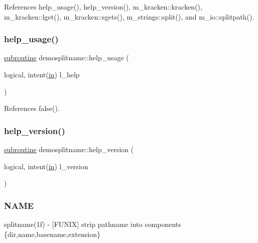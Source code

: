 References help\+\_\+usage(), help\+\_\+version(), m\+\_\+kracken\+::kracken(), m\+\_\+kracken\+::lget(), m\+\_\+kracken\+::sgets(), m\+\_\+strings\+::split(), and m\+\_\+io\+::splitpath().

\mbox{\label{splitname_8f90_ae98d08b210b063a2558aa2abdb67fa8e}} 
\subsubsection{\texorpdfstring{help\+\_\+usage()}{help\_usage()}}
{\footnotesize\ttfamily \hyperlink{M__stopwatch_83_8txt_acfbcff50169d691ff02d4a123ed70482}{subroutine} demosplitname\+::help\+\_\+usage (\begin{DoxyParamCaption}\item[{logical, intent(\hyperlink{M__journal_83_8txt_afce72651d1eed785a2132bee863b2f38}{in})}]{l\+\_\+help }\end{DoxyParamCaption})}



References false().

\mbox{\label{splitname_8f90_a2518cc098132c46ba9d8fd8c74d8fc0d}} 
\subsubsection{\texorpdfstring{help\+\_\+version()}{help\_version()}}
{\footnotesize\ttfamily \hyperlink{M__stopwatch_83_8txt_acfbcff50169d691ff02d4a123ed70482}{subroutine} demosplitname\+::help\+\_\+version (\begin{DoxyParamCaption}\item[{logical, intent(\hyperlink{M__journal_83_8txt_afce72651d1eed785a2132bee863b2f38}{in})}]{l\+\_\+version }\end{DoxyParamCaption})}



\subsubsection*{N\+A\+ME}

splitname(1f) -\/ \mbox{[}F\+U\+N\+IX\mbox{]} strip pathname into components \{dir,name,basename,extension\} 

